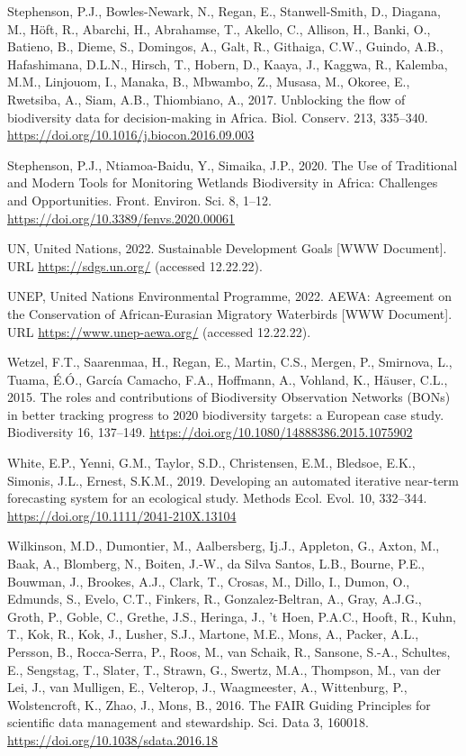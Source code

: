 \documentclass[utf8]{frontiersSCNS}
\begin{document}
Stephenson, P.J., Bowles-Newark, N., Regan, E., Stanwell-Smith, D.,
Diagana, M., Höft, R., Abarchi, H., Abrahamse, T., Akello, C., Allison,
H., Banki, O., Batieno, B., Dieme, S., Domingos, A., Galt, R., Githaiga,
C.W., Guindo, A.B., Hafashimana, D.L.N., Hirsch, T., Hobern, D., Kaaya,
J., Kaggwa, R., Kalemba, M.M., Linjouom, I., Manaka, B., Mbwambo, Z.,
Musasa, M., Okoree, E., Rwetsiba, A., Siam, A.B., Thiombiano, A., 2017.
Unblocking the flow of biodiversity data for decision-making in Africa.
Biol. Conserv. 213, 335--340.
\url{https://doi.org/10.1016/j.biocon.2016.09.003}

Stephenson, P.J., Ntiamoa-Baidu, Y., Simaika, J.P., 2020. The Use of
Traditional and Modern Tools for Monitoring Wetlands Biodiversity in
Africa: Challenges and Opportunities. Front. Environ. Sci. 8, 1--12.
\url{https://doi.org/10.3389/fenvs.2020.00061}

UN, United Nations, 2022. Sustainable Development Goals {[}WWW
Document{]}. URL \url{https://sdgs.un.org/} (accessed 12.22.22).

UNEP, United Nations Environmental Programme, 2022. AEWA: Agreement on
the Conservation of African-Eurasian Migratory Waterbirds {[}WWW
Document{]}. URL \url{https://www.unep-aewa.org/} (accessed 12.22.22).

Wetzel, F.T., Saarenmaa, H., Regan, E., Martin, C.S., Mergen, P.,
Smirnova, L., Tuama, É.Ó., García Camacho, F.A., Hoffmann, A., Vohland,
K., Häuser, C.L., 2015. The roles and contributions of Biodiversity
Observation Networks (BONs) in better tracking progress to 2020
biodiversity targets: a European case study. Biodiversity 16, 137--149.
\url{https://doi.org/10.1080/14888386.2015.1075902}

White, E.P., Yenni, G.M., Taylor, S.D., Christensen, E.M., Bledsoe,
E.K., Simonis, J.L., Ernest, S.K.M., 2019. Developing an automated
iterative near-term forecasting system for an ecological study. Methods
Ecol. Evol. 10, 332--344. \url{https://doi.org/10.1111/2041-210X.13104}

Wilkinson, M.D., Dumontier, M., Aalbersberg, Ij.J., Appleton, G., Axton,
M., Baak, A., Blomberg, N., Boiten, J.-W., da Silva Santos, L.B.,
Bourne, P.E., Bouwman, J., Brookes, A.J., Clark, T., Crosas, M., Dillo,
I., Dumon, O., Edmunds, S., Evelo, C.T., Finkers, R., Gonzalez-Beltran,
A., Gray, A.J.G., Groth, P., Goble, C., Grethe, J.S., Heringa, J., 't
Hoen, P.A.C., Hooft, R., Kuhn, T., Kok, R., Kok, J., Lusher, S.J.,
Martone, M.E., Mons, A., Packer, A.L., Persson, B., Rocca-Serra, P.,
Roos, M., van Schaik, R., Sansone, S.-A., Schultes, E., Sengstag, T.,
Slater, T., Strawn, G., Swertz, M.A., Thompson, M., van der Lei, J., van
Mulligen, E., Velterop, J., Waagmeester, A., Wittenburg, P.,
Wolstencroft, K., Zhao, J., Mons, B., 2016. The FAIR Guiding Principles
for scientific data management and stewardship. Sci. Data 3, 160018.
\url{https://doi.org/10.1038/sdata.2016.18}
\end{document}
